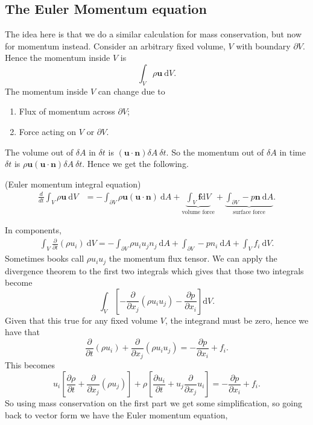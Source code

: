 \documentclass{article}
\begin{document}
\subsection{The Euler Momentum equation}
The idea here is that we do a similar calculation for mass conservation, but now for momentum instead. Consider an arbitrary fixed volume, $ V $ with boundary $ \partial V $. Hence the momentum inside $ V $ is
\[
  \int_V \rho \mathbf u\ \mathrm dV.
\]
The momentum inside $ V $ can change due to
\begin{enumerate}
	\item Flux of momentum across $ \partial V $;
	\item Force acting on $ V $ or $ \partial V $.
\end{enumerate}
The volume out of $ \delta A $ in $ \delta t $ is $ (\mathbf u\cdot\mathbf n )\delta A\ \delta t $. So the momentum out of $ \delta A $ in time $ \delta t $ is $ \rho \mathbf u (\mathbf u \cdot\mathbf n)\delta A\ \delta t $. Hence we get the following.
\begin{theorem}
	(Euler momentum integral equation)
\begin{align*}
	\frac d{dt} \int_V\rho \mathbf u\  \mathrm dV &= -\int_{\partial V}\rho \mathbf u (\mathbf u \cdot \mathbf n)\ \mathrm d A + \underbrace{\int_V \mathbf f\mathrm dV}_{\text{volume force}} + \underbrace{\int_{\partial V} - p\mathbf n \ \mathrm dA}_{\text{surface force}}.
\end{align*}
\end{theorem}
In components,
\begin{align*}
	\int_V\frac\partial{\partial t}(\rho u_i)\ \mathrm dV = -\int_{\partial V} \rho u_iu_jn_j\ \mathrm dA + \int_{\partial V} - pn_i\ \mathrm dA + \int_V f_i \ \mathrm dV.
\end{align*}
Sometimes books call $ \rho u_i u_j $ the momentum flux tensor. We can apply the divergence theorem to the first two integrals which gives that those two integrals become
\[
	\int_V\left[-\frac{\partial}{\partial x_j}(\rho u_iu_j)-\frac{\partial p}{\partial x_i}\right]\mathrm dV.
\]
Given that this true for any fixed volume $ V $, the integrand must be zero, hence we have that
\[
	\frac\partial{\partial t}(\rho u_i)+\frac{\partial}{\partial x_j}(\rho u_iu_j)=-\frac{\partial p}{\partial x_i}+f_i.
\]
This becomes
\[
	u_i\left[\frac{\partial \rho}{\partial t}+\frac{\partial}{\partial x_j}(\rho u_j)\right]+\rho\left[\frac{\partial u_i}{\partial t} + u_j\frac{\partial}{\partial x_j} u_i\right]=-\frac{\partial p}{\partial x_i} + f_i.
\]
So using mass conservation on the first part we get some simplification, so going back to vector form we have the Euler momentum equation,
\end{document}
